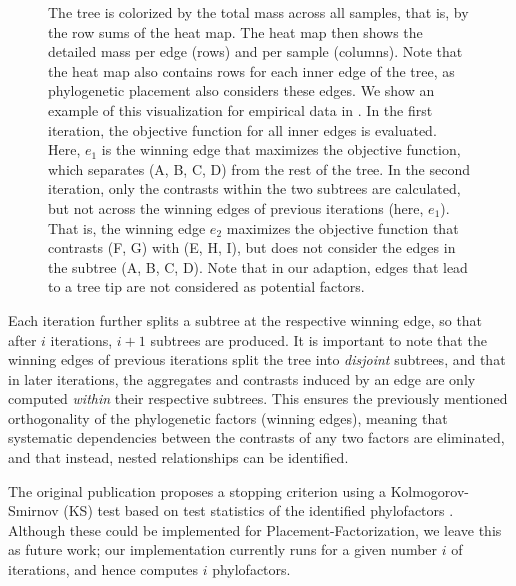 \begin{figure}[!htb]
{        The tree is colorized by the total mass across all samples, that is, by the row sums of the heat map.
        The heat map then shows the detailed mass per edge (rows) and per sample (columns).
        Note that the heat map also contains rows for each inner edge of the tree,
        as phylogenetic placement also considers these edges.
        We show an example of this visualization for empirical data in .
         In the first iteration,
        the objective function for all inner edges is evaluated.
        Here, $e_1$ is the winning edge that maximizes the objective function,
        which separates ({\sffamily A}, {\sffamily B}, {\sffamily C}, {\sffamily D}) from the rest of the tree.
         In the second iteration,
        only the contrasts within the two subtrees %
        are calculated,
        but not across the winning edges of previous iterations (here, $e_1$).
        That is, the winning edge $e_2$ maximizes the objective function that contrasts ({\sffamily F}, {\sffamily G})
        with ({\sffamily E}, {\sffamily H}, {\sffamily I}),
        but does not consider the edges in the subtree ({\sffamily A}, {\sffamily B}, {\sffamily C}, {\sffamily D}).
        Note that in our adaption, edges that lead to a tree tip are not considered as potential factors.
    }
    \label{fig:phylofactor}
\end{figure}

Each iteration further splits a subtree at the respective winning edge,
so that after $i$ iterations, $i+1$ subtrees are produced.
It is important to note that the winning edges of previous iterations split the tree into \emph{disjoint} subtrees,
and that in later iterations,
the aggregates and contrasts induced by an edge are only computed \emph{within} their respective subtrees.
This ensures the previously mentioned orthogonality of the phylogenetic factors (winning edges),
meaning that systematic dependencies between the contrasts of any two factors are eliminated,
and that instead, nested relationships can be identified.

The original publication proposes a stopping criterion using a Kolmogorov-Smirnov (KS) test based on %
test statistics of the identified phylofactors \cite{Washburne2017a,Washburne2019}.
Although these could be implemented for Placement-Factorization, we leave this as future work;
our implementation currently runs for a given number $i$ of iterations, and hence computes $i$ phylofactors.

